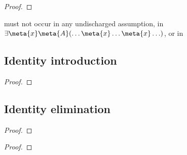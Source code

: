 \begin{multicols}{2}
\begin{proof}
	\open	
	\close
\end{proof}

\medskip\begin{raggedright}
\noindent {} must not occur in any undischarged assumption, in $\exists \meta{x}\meta{A}(\ldots \meta{x} \ldots \meta{x}\ldots)$, or in \end{raggedright}\vfill\columnbreak

\end{multicols}

\subsection*{Identity introduction}

\begin{proof}
	 
\end{proof}


\subsection*{Identity elimination}

\begin{multicols}{2}
\begin{proof}
	 
\end{proof}
\begin{proof}
	 
\end{proof}
\end{multicols}

